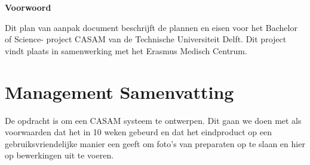 \begin{center}
\textbf{\large Voorwoord}
\end{center}

Dit plan van aanpak document beschrijft de plannen en eisen voor het Bachelor of Science-
project CASAM van de Technische Universiteit Delft. Dit project vindt plaats
in samenwerking met het Erasmus Medisch Centrum.

\setcounter{section}{-1}
\section{Management Samenvatting}

De opdracht is om een CASAM systeem te ontwerpen. Dit gaan we doen met als
voorwaarden dat het in 10 weken gebeurd en dat het eindproduct op een
gebruiksvriendelijke manier een geeft om foto's van preparaten op te slaan
en hier op bewerkingen uit te voeren.


